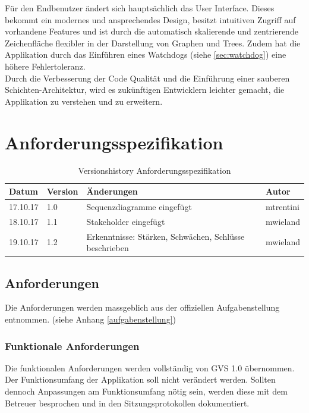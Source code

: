 \documentclass[11pt,a4paper,english,oneside]{book}
\numberwithin{equation}{chapter}
\begin{document}
	\noindent
	Für den Endbenutzer ändert sich hauptsächlich das User Interface. Dieses bekommt ein modernes und ansprechendes Design, besitzt intuitiven Zugriff auf vorhandene Features und ist durch die automatisch skalierende und zentrierende Zeichenfläche flexibler in der Darstellung von Graphen und Trees. Zudem hat die Applikation durch das Einführen eines Watchdogs (siehe \ref{sec:watchdog}) eine höhere Fehlertoleranz. \\
	
	\noindent
	Durch die Verbesserung der Code Qualität und die Einführung einer sauberen Schichten-Architektur, wird es zukünftigen Entwicklern leichter gemacht, die Applikation zu verstehen und zu erweitern.	
	
	
	
	
	\chapter{Anforderungsspezifikation}
	
	\begin{table}[h!]
		\centering
		\begin{tabularx}{\linewidth}{l l X l}
			\toprule 
			Datum & Version & Änderungen & Autor \\
			\midrule
			17.10.17 & 1.0 & Sequenzdiagramme eingefügt & mtrentini \\
			18.10.17 & 1.1 & Stakeholder eingefügt & mwieland \\
			19.10.17 & 1.2 & Erkenntnisse: Stärken, Schwächen, Schlüsse beschrieben & mwieland \\
			\bottomrule 
		\end{tabularx} 
		\caption{Versionshistory Anforderungsspezifikation} 
	\end{table}
	
	
	
	\section{Anforderungen} \label{sec:functionalreq}
	Die Anforderungen werden massgeblich aus der offiziellen Aufgabenstellung entnommen. (siehe Anhang \ref{aufgabenstellung})
	
	\subsection{Funktionale Anforderungen}
	Die funktionalen Anforderungen werden vollständig von GVS 1.0 \cite{gvs1} übernommen. Der Funktionsumfang der Applikation soll nicht verändert werden. Sollten dennoch Anpassungen am Funktionsumfang nötig sein, werden diese mit dem Betreuer besprochen und in den Sitzungsprotokollen dokumentiert.
	
\end{document}
